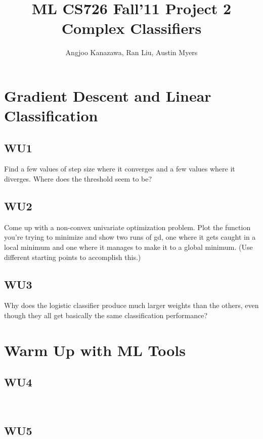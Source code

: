 \documentclass[a4paper,11pt]{article}
\begin{document}
\title{ML CS726 Fall'11 Project 2 Complex Classifiers}
\author{Angjoo Kanazawa, Ran Liu, Austin Myers}
\maketitle


\section{Gradient Descent and Linear Classification}
\subsection{WU1}
\textsf{Find a few values of step size where it converges and a few values where it diverges. Where does the threshold seem to be?}\\

\subsection{WU2}
\textsf{Come up with a non-convex univariate optimization problem. Plot the function you're trying to minimize and show two runs of gd, one where it gets caught in a local minimum and one where it manages to make it to a global minimum. (Use different starting points to accomplish this.)}\\
\subsection{WU3}
\textsf{Why does the logistic classifier produce much larger weights than the others, even though they all get basically the same classification performance?}\\

\section{Warm Up with ML Tools}
\label{sec:warmup}
\subsection{WU4}
\textsf{}\\

\subsection{WU5}
\textsf{}\\
\end{document}
